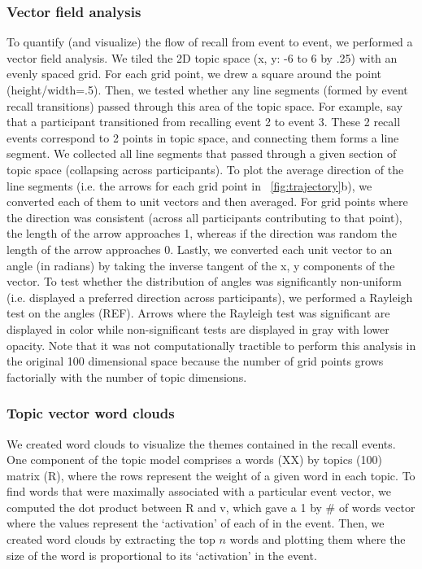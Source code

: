 \documentclass{article}
\begin{document}
{\subsubsection{Vector field analysis}
To quantify (and visualize) the flow of recall from event to event, we performed a vector field analysis.  We tiled the 2D topic space (x, y: -6 to 6 by .25) with an evenly spaced grid. For each grid point, we drew a square around the point (height/width=.5). Then, we tested whether any line segments (formed by event recall transitions) passed through this area of the topic space.  For example, say that a participant transitioned from recalling event 2 to event 3. These 2 recall events correspond to 2 points in topic space, and connecting them forms a line segment. We collected all line segments that passed through a given section of topic space (collapsing across participants). To plot the average direction of the line segments (i.e. the arrows for each grid point in ~\ref{fig:trajectory}b), we converted each of them to unit vectors and then averaged. For grid points where the direction was consistent (across all participants contributing to that point), the length of the arrow approaches 1, whereas if the direction was random the length of the arrow approaches 0. Lastly, we converted each unit vector to an angle (in radians) by taking the inverse tangent of the x, y components of the vector. To test whether the distribution of angles was significantly non-uniform (i.e. displayed a preferred direction across participants), we performed a Rayleigh test on the angles (REF). Arrows where the Rayleigh test was significant are displayed in color while non-significant tests are displayed in gray with lower opacity. Note that it was not computationally tractible to perform this analysis in the original 100 dimensional space because the number of grid points grows factorially with the number of topic dimensions.


\subsubsection{Topic vector word clouds}
 We created word clouds to visualize the themes contained in the recall events. One component of the topic model comprises a words (XX) by topics (100) matrix (R), where the rows represent the weight of a given word in each topic.  To find words that were maximally associated with a particular event vector, we computed the dot product between R and v, which gave a 1 by \# of words vector where the values represent the `activation' of each of in the event. Then, we created word clouds by extracting the top $n$ words and plotting them where the size of the word is proportional to its `activation' in the event.

}
\end{document}
